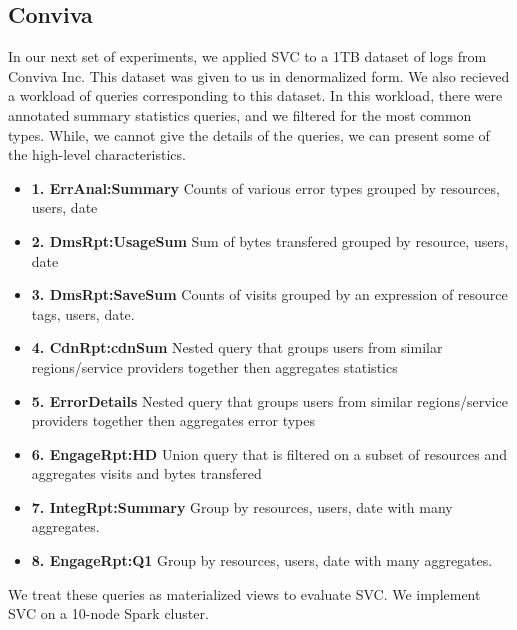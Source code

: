 \subsection{Conviva}
In our next set of experiments, we applied SVC to a 1TB dataset of logs from Conviva Inc.
This dataset was given to us in denormalized form.
We also recieved a workload of queries corresponding to this dataset.
In this workload, there were annotated summary statistics queries, and we filtered for the most common types.
While, we cannot give the details of the queries, we can present some of the high-level characteristics.
\begin{itemize}
\item \textbf{1. ErrAnal:Summary} Counts of various error types grouped by resources, users, date
\item \textbf{2. DmsRpt:UsageSum} Sum of bytes transfered grouped by resource, users, date
\item \textbf{3. DmsRpt:SaveSum} Counts of visits grouped by an expression of resource tags, users, date.
\item \textbf{4. CdnRpt:cdnSum} Nested query that groups users from similar regions/service providers together then aggregates statistics
\item \textbf{5. ErrorDetails} Nested query that groups users from similar regions/service providers together then aggregates error types
\item \textbf{6. EngageRpt:HD} Union query that is filtered on a subset of resources and aggregates visits and bytes transfered
\item \textbf{7. IntegRpt:Summary} Group by resources, users, date with many aggregates.
\item \textbf{8. EngageRpt:Q1} Group by resources, users, date with many aggregates.
\end{itemize}
We treat these queries as materialized views to evaluate SVC.
We implement SVC on a 10-node Spark cluster.

